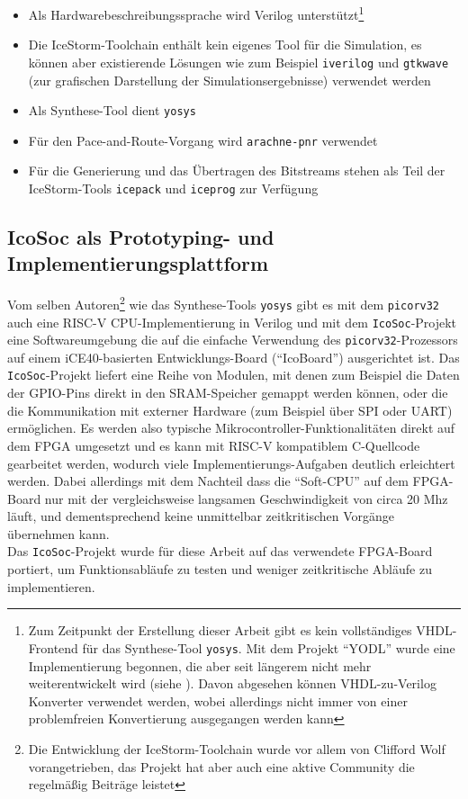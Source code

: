 \begin{itemize}
	\item Als Hardwarebeschreibungssprache wird Verilog unterstützt\footnote{Zum Zeitpunkt der Erstellung dieser Arbeit gibt es kein vollständiges VHDL-Frontend für das Synthese-Tool {\tt yosys}. Mit dem Projekt ``YODL'' wurde eine Implementierung begonnen, die aber seit längerem nicht mehr weiterentwickelt wird (siehe \cite{web:yodl}). Davon abgesehen können VHDL-zu-Verilog Konverter verwendet werden, wobei allerdings nicht immer von einer problemfreien Konvertierung ausgegangen werden kann} 
	\item Die IceStorm-Toolchain enthält kein eigenes Tool für die Simulation, es können aber existierende Lösungen wie zum Beispiel {\tt iverilog}\cite{web:iverilog} und {\tt gtkwave}\cite{web:gtkwave} (zur grafischen Darstellung der Simulationsergebnisse) verwendet werden
	\item Als Synthese-Tool dient {\tt yosys}\cite{web:yosys}
	\item Für den Pace-and-Route-Vorgang wird {\tt arachne-pnr}\cite{web:arachne_pnr} verwendet
	\item Für die Generierung und das Übertragen des Bitstreams stehen als Teil der IceStorm-Tools\cite{web:icestorm_tools} {\tt icepack} und {\tt iceprog} zur Verfügung
\end{itemize}



\subsection{IcoSoc als Prototyping- und Implementierungsplattform} 

Vom selben Autoren\footnote{Die Entwicklung der IceStorm-Toolchain wurde vor allem von Clifford Wolf vorangetrieben, das Projekt hat aber auch eine aktive Community die regelmäßig Beiträge leistet} wie das Synthese-Tools {\tt yosys} gibt es mit dem {\tt picorv32} auch eine RISC-V CPU-Implementierung in Verilog und mit dem {\tt IcoSoc}-Projekt eine Softwareumgebung die auf die einfache Verwendung des {\tt picorv32}-Prozessors auf einem iCE40-basierten Entwicklungs-Board (``IcoBoard'') ausgerichtet ist. Das {\tt IcoSoc}-Projekt liefert eine Reihe von Modulen, mit denen zum Beispiel die Daten der GPIO-Pins direkt in den SRAM-Speicher gemappt werden können, oder die die Kommunikation mit externer Hardware (zum Beispiel über SPI oder UART) ermöglichen. Es werden also typische Mikrocontroller-Funktionalitäten direkt auf dem FPGA umgesetzt und es kann mit RISC-V kompatiblem C-Quellcode gearbeitet werden, wodurch viele Implementierungs-Aufgaben deutlich erleichtert werden. Dabei allerdings mit dem Nachteil dass die ``Soft-CPU'' auf dem FPGA-Board nur mit der vergleichsweise langsamen Geschwindigkeit von circa 20 Mhz läuft, und dementsprechend keine unmittelbar zeitkritischen Vorgänge übernehmen kann.\\
Das {\tt IcoSoc}-Projekt wurde für diese Arbeit auf das verwendete FPGA-Board portiert, um Funktionsabläufe zu testen und weniger zeitkritische Abläufe zu implementieren.



